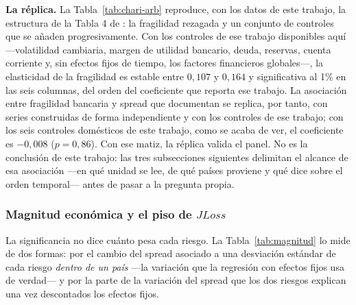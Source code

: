 \textbf{La réplica.} La Tabla~\ref{tab:chari-arb} reproduce, con los datos de este trabajo, la estructura de la Tabla 4 de \citet{Chari2024b}: la fragilidad rezagada y un conjunto de controles que se añaden progresivamente. Con los controles de ese trabajo disponibles aquí ---volatilidad cambiaria, margen de utilidad bancario, deuda, reservas, cuenta corriente y, sin efectos fijos de tiempo, los factores financieros globales---, la elasticidad de la fragilidad es estable entre $0{,}107$ y $0{,}164$ y significativa al 1\% en las seis columnas, del orden del coeficiente que reporta ese trabajo. La asociación entre fragilidad bancaria y spread que documentan \citet{Chari2024b} se replica, por tanto, con series construidas de forma independiente y con los controles de ese trabajo; con los seis controles domésticos de este trabajo, como se acaba de ver, el coeficiente es $-0{,}008$ ($p=0{,}86$). Con ese matiz, la réplica valida el panel. No es la conclusión de este trabajo: las tres subsecciones siguientes delimitan el alcance de esa asociación ---en qué unidad se lee, de qué países proviene y qué dice sobre el orden temporal--- antes de pasar a la pregunta propia.



\subsubsection{Magnitud económica y el piso de \texorpdfstring{$JLoss$}{JLoss}}
\label{sec:magnitud}

La significancia no dice cuánto pesa cada riesgo. La Tabla~\ref{tab:magnitud} lo mide de dos formas: por el cambio del spread asociado a una desviación estándar de cada riesgo \emph{dentro de un país} ---la variación que la regresión con efectos fijos usa de verdad--- y por la parte de la variación del spread que los dos riesgos explican una vez descontados los efectos fijos.

